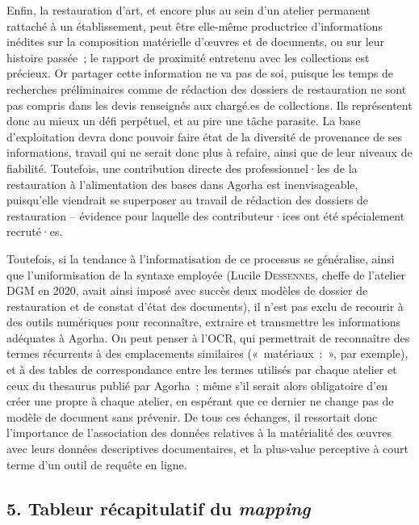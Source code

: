 \documentclass[a4paper,12pt, twoside]{book}
\begin{document}
Enfin, la restauration d’art, et encore plus au sein d’un atelier permanent rattaché à un établissement, peut être elle-même productrice d’informations inédites sur la composition matérielle d’œuvres et de documents, ou sur leur histoire passée~; le rapport de proximité entretenu avec les collections est précieux. Or partager cette information ne va pas de soi, puisque les temps de recherches préliminaires comme de rédaction des dossiers de restauration ne sont pas compris dans les devis renseignés aux chargé.es de collections. Ils représentent donc au mieux un défi perpétuel, et au pire une tâche parasite. La base d’exploitation devra donc pouvoir faire état de la diversité de provenance de ses informations, travail qui ne serait donc plus à refaire, ainsi que de leur niveaux de fiabilité. Toutefois, une contribution directe des professionnel·les de la restauration à l’alimentation des bases dans Agorha est inenvisageable, puisqu’elle viendrait se superposer au travail de rédaction des dossiers de restauration – évidence pour laquelle des contributeur·ices ont été spécialement recruté·es.

Toutefois, si la tendance à l’informatisation de ce processus se généralise, ainsi que l’uniformisation de la syntaxe employée (Lucile \textsc{Dessennes}, cheffe de l’atelier DGM en 2020, avait ainsi imposé avec succès deux modèles de dossier de restauration et de constat d’état des documents), il n’est pas exclu de recourir à des outils numériques pour reconnaître, extraire et transmettre les informations adéquates à Agorha. On peut penser à l’OCR, qui permettrait de reconnaître des termes récurrents à des emplacements similaires («~matériaux~:~», par exemple), et à des tables de correspondance entre les termes utilisés par chaque atelier et ceux du thesaurus publié par Agorha~; même s’il serait alors obligatoire d’en créer une propre à chaque atelier, en espérant que ce dernier ne change pas de modèle de document sans prévenir. De tous ces échanges, il ressortait donc l’importance de l’association des données relatives à la matérialité des œuvres avec leurs données descriptives documentaires, et la plus-value perceptive à court terme d’un outil de requête en ligne.

\clearemptydoublepage
\begin{landscape}
\chapter*{5. Tableur récapitulatif du \textit{mapping}}

\end{landscape}
\end{document}
